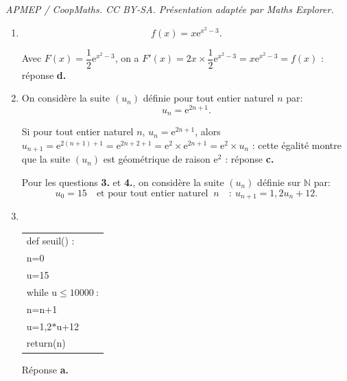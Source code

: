 \documentclass[10pt]{article}
\providecommand{\N}{\mathbb{N}}
\providecommand{\e}{{\mathrm{e}}}
\providecommand{\np}[2][]{{#2~#1}}
\begin{document}
\noindent\textit{APMEP / CoopMaths. CC BY-SA. Présentation adaptée par Maths Explorer.}\par\medskip
\medskip








\begin{enumerate}
\item 
\[f(x) = x \e^{x^2 - 3}.\]








Avec $F(x) = \dfrac12 \e^{x^2 - 3}$, on a $F'(x) = 2x \times \dfrac12\e^{x^2 - 3} = x\e^{x^2 - 3} = f(x)$ : réponse \textbf{d.~}






\item On considère la suite $\left(u_n\right)$ définie pour tout entier naturel $n$ par: \[u_n = \e^{2n+1}.\]









Si pour tout entier naturel $n$, \: $u_n = \e^{2n+1}$, alors $u_{n+1} = \e^{2(n+1)+ 1} = \e^{2n + 2 + 1} = \e^{2} \times \e^{2n + 1} = \e^{2} \times u_n$ : cette égalité montre que la suite $\left(u_n\right)$ est géométrique de raison $\e^{2}$ : réponse \textbf{c.~~}

Pour les questions \textbf{3.} et \textbf{4.}, on considère la suite $\left(u_n\right)$ définie sur $\N$ par:
\[u_0 = 15 \quad \text{et pour tout entier naturel }\: n \quad :\: u_{n+1} = 1,2u_n + 12.\]

\item ~

\begin{center}
\begin{tabular}{|>{\ttfamily}l|}\hline
def seuil() :\\
\qquad n=0\\
\qquad u=15\\
\qquad while u$\leqslant \np{10000}$:\\
\qquad \quad n=n+1\\
\qquad \quad u=1,2$*$u+12\\
\qquad return(n)\\ \hline
\end{tabular}
\end{center}

Réponse \textbf{a.}









\end{enumerate}
\end{document}
